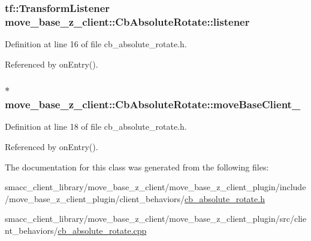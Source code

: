 \subsubsection[{\texorpdfstring{listener}{listener}}]{\setlength{\rightskip}{0pt plus 5cm}tf\+::\+Transform\+Listener move\+\_\+base\+\_\+z\+\_\+client\+::\+Cb\+Absolute\+Rotate\+::listener}\hypertarget{classmove__base__z__client_1_1CbAbsoluteRotate_a78740c9a93398f6a41bc4e5171e5a581}{}\label{classmove__base__z__client_1_1CbAbsoluteRotate_a78740c9a93398f6a41bc4e5171e5a581}


Definition at line 16 of file cb\+\_\+absolute\+\_\+rotate.\+h.



Referenced by on\+Entry().

\subsubsection[{\texorpdfstring{move\+Base\+Client\+\_\+}{moveBaseClient_}}]{$\ast$ move\+\_\+base\+\_\+z\+\_\+client\+::\+Cb\+Absolute\+Rotate\+::move\+Base\+Client\+\_\+}\hypertarget{classmove__base__z__client_1_1CbAbsoluteRotate_a2a96d8ec86bb2802391b044da7f10daf}{}\label{classmove__base__z__client_1_1CbAbsoluteRotate_a2a96d8ec86bb2802391b044da7f10daf}


Definition at line 18 of file cb\+\_\+absolute\+\_\+rotate.\+h.



Referenced by on\+Entry().



The documentation for this class was generated from the following files\+:\begin{DoxyCompactItemize}
\item 
smacc\+\_\+client\+\_\+library/move\+\_\+base\+\_\+z\+\_\+client/move\+\_\+base\+\_\+z\+\_\+client\+\_\+plugin/include/move\+\_\+base\+\_\+z\+\_\+client\+\_\+plugin/client\+\_\+behaviors/\hyperlink{cb__absolute__rotate_8h}{cb\+\_\+absolute\+\_\+rotate.\+h}\item 
smacc\+\_\+client\+\_\+library/move\+\_\+base\+\_\+z\+\_\+client/move\+\_\+base\+\_\+z\+\_\+client\+\_\+plugin/src/client\+\_\+behaviors/\hyperlink{cb__absolute__rotate_8cpp}{cb\+\_\+absolute\+\_\+rotate.\+cpp}\end{DoxyCompactItemize}
